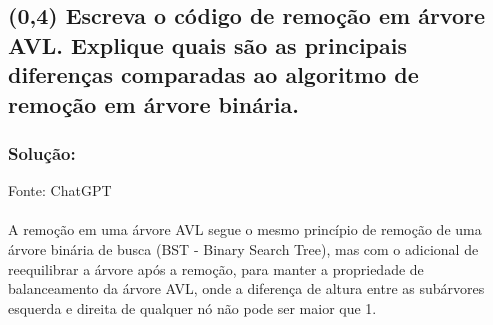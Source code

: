 \documentclass{article}
\begin{document}
\begin{enumerate}
\begin{center}
  \end{center}

\end{enumerate}

\subsection {(0,4) Escreva o código de remoção em árvore AVL. Explique quais são as principais
diferenças comparadas ao algoritmo de remoção em árvore binária.}

\subsubsection{Solução:}

Fonte: ChatGPT
\\
\\
A remoção em uma árvore AVL segue o mesmo princípio de remoção de uma árvore binária de busca (BST - Binary Search Tree), 
mas com o adicional de reequilibrar a árvore após a remoção, para manter a propriedade de balanceamento da árvore AVL, 
onde a diferença de altura entre as subárvores esquerda e direita de qualquer nó não pode ser maior que 1.
\end{document}
